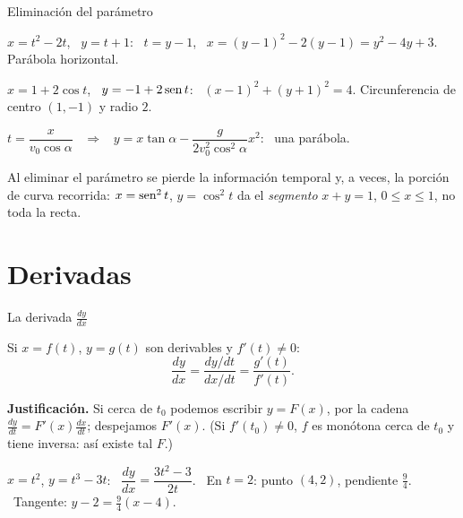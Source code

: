 \documentclass[10pt,aspectratio=169]{beamer}
\begin{document}
\begin{frame}{Eliminación del parámetro}
  \begin{ejemplo}[3]
    $x=t^2-2t$, \ $y=t+1$: \ $t=y-1$, \ $x=(y-1)^2-2(y-1)=y^2-4y+3$. Parábola horizontal.
  \end{ejemplo}
  \begin{ejemplo}
    $x=1+2\cos t$, \ $y=-1+2\operatorname{sen} t$: \ $(x-1)^2+(y+1)^2=4$. Circunferencia de centro $(1,-1)$ y radio $2$.
  \end{ejemplo}
  \begin{ejemplo}[5: proyectil]
    $t=\dfrac{x}{v_0\cos\alpha}$ \ $\Rightarrow$ \ $y=x\tan\alpha-\dfrac{g}{2v_0^2\cos^2\alpha}x^2$: \ una parábola.
  \end{ejemplo}
  \begin{observacion}
    Al eliminar el parámetro se pierde la información temporal y, a veces, la porción de curva recorrida:
    $x=\operatorname{sen}^2t$, $y=\cos^2t$ da el \emph{segmento} $x+y=1$, $0\le x\le1$, no toda la recta.
  \end{observacion}
\end{frame}

\section{Derivadas}

\begin{frame}{La derivada $\frac{dy}{dx}$}
  \begin{teorema}
    Si $x=f(t)$, $y=g(t)$ son derivables y $f'(t)\neq0$:
    \[ \frac{dy}{dx}=\frac{dy/dt}{dx/dt}=\frac{g'(t)}{f'(t)}. \]
  \end{teorema}
  \textbf{Justificación.} Si cerca de $t_0$ podemos escribir $y=F(x)$, por la cadena $\frac{dy}{dt}=F'(x)\frac{dx}{dt}$; despejamos $F'(x)$.
  (Si $f'(t_0)\ne0$, $f$ es monótona cerca de $t_0$ y tiene inversa: así existe tal $F$.)
  \begin{ejemplo}[6]
    $x=t^2$, $y=t^3-3t$: \ $\dfrac{dy}{dx}=\dfrac{3t^2-3}{2t}$. \ En $t=2$: punto $(4,2)$, pendiente $\frac{9}{4}$.
    \ Tangente: $y-2=\frac94(x-4)$.
  \end{ejemplo}
\end{frame}
\end{document}
